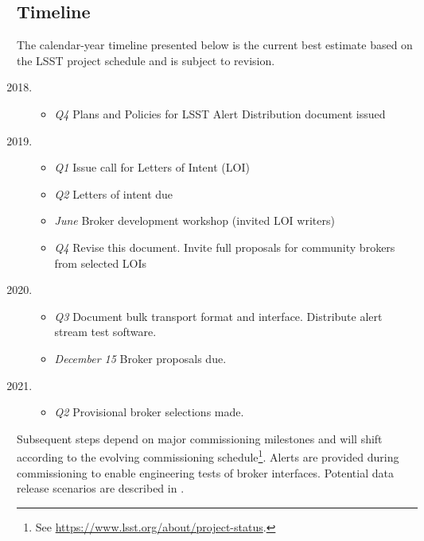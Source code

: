 \subsection{Timeline}

The calendar-year timeline presented below is the current best estimate based on the LSST project schedule and is subject to revision.
{
	\renewcommand\labelenumi{\textbf{\theenumi}}
\begin{enumerate}
  \setcounter{enumi}{2017}
	\item \begin{itemize} %
		\item \textit{Q4} Plans and Policies for LSST Alert Distribution document issued
	\end{itemize}
	\item \begin{itemize}%
		\item \textit{Q1} Issue call for Letters of Intent (LOI)
		\item \textit{Q2} Letters of intent due
		\item \textit{June} Broker development workshop (invited LOI writers)
		\item \textit{Q4} Revise this document. Invite full proposals for community brokers from selected LOIs
		\end{itemize}
	\item \begin{itemize} %
		\item \textit{Q3} Document bulk transport format and interface. Distribute alert stream test software.
		\item \textit{December 15} Broker proposals due.
	\end{itemize}
	\item \begin{itemize} %
		\item \textit{Q2} Provisional broker selections made.
		\end{itemize}
\end{enumerate}
}

Subsequent steps depend on major commissioning milestones and will shift according to the evolving commissioning schedule\footnote{See \url{https://www.lsst.org/about/project-status}.}.
Alerts are provided during commissioning to enable engineering tests of broker interfaces.
Potential data release scenarios are described in .


